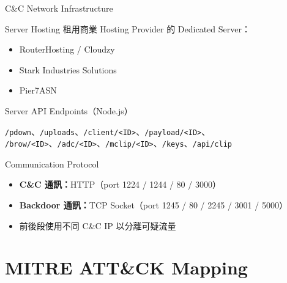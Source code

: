 \documentclass{beamer}
\begin{document}
\begin{frame}{C\&C Network Infrastructure}
  \begin{block}{Server Hosting}
    租用商業 Hosting Provider 的 Dedicated Server：
    \begin{itemize}
      \item RouterHosting / Cloudzy
      \item Stark Industries Solutions
      \item Pier7ASN
    \end{itemize}
  \end{block}

  \begin{block}{Server API Endpoints（Node.js）}
    \begin{small}
    \texttt{/pdown}、\texttt{/uploads}、\texttt{/client/<ID>}、\texttt{/payload/<ID>}、
    \texttt{/brow/<ID>}、\texttt{/adc/<ID>}、\texttt{/mclip/<ID>}、\texttt{/keys}、\texttt{/api/clip}
    \end{small}
  \end{block}

  \begin{block}{Communication Protocol}
    \begin{itemize}
      \item \textbf{C\&C 通訊：}HTTP（port 1224 / 1244 / 80 / 3000）
      \item \textbf{Backdoor 通訊：}TCP Socket（port 1245 / 80 / 2245 / 3001 / 5000）
      \item 前後段使用不同 C\&C IP 以分離可疑流量
    \end{itemize}
  \end{block}
\end{frame}

\section{MITRE ATT\&CK Mapping}
\end{document}

